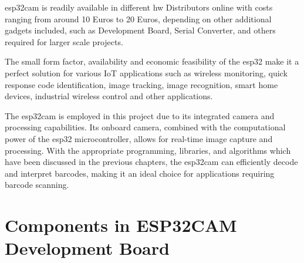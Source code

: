 \medskip

\ac{esp32cam} is readily available in different \ac{hw} Distributors online with costs ranging from around 10 Euros to 20 Euros, depending on other additional gadgets included, such as Development Board, Serial Converter, and others required for larger scale projects.

\medskip

The small form factor, availability and economic feasibility of the \ac{esp32} make it a perfect solution for various IoT applications such as wireless monitoring, quick response code identification, image tracking, image recognition, smart home devices, industrial wireless control and other applications.

\medskip

The \ac{esp32cam} is employed in this project due to its integrated camera and processing capabilities. Its onboard camera, combined with the computational power of the \ac{esp32} microcontroller, allows for real-time image capture and processing. With the appropriate programming, libraries, and algorithms which have been discussed in the previous chapters, the \ac{esp32cam} can efficiently decode and interpret barcodes, making it an ideal choice for applications requiring barcode scanning.

\section{Components in ESP32CAM Development Board}



